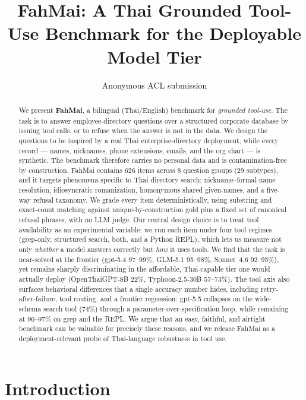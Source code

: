 \documentclass[11pt]{article}
\title{FahMai: A Thai Grounded Tool-Use Benchmark for the Deployable Model Tier}
\author{Anonymous ACL submission}
\begin{document}
\maketitle

\begin{abstract}
We present \textbf{FahMai}, a bilingual (Thai/English) benchmark for \emph{grounded tool-use}. The
task is to answer employee-directory questions over a structured corporate database by issuing tool
calls, or to refuse when the answer is not in the data. We design the questions to be inspired by a
real Thai enterprise-directory deployment, while every record --- names, nicknames, phone extensions,
emails, and the org chart --- is synthetic. The benchmark therefore carries no personal data and is
contamination-free by construction. FahMai contains 626 items across 8 question groups (29 subtypes),
and it targets phenomena specific to Thai directory search: nickname--formal-name resolution,
idiosyncratic romanization, homonymous shared given-names, and a five-way refusal taxonomy. We grade
every item deterministically, using substring and exact-count matching against unique-by-construction
gold plus a fixed set of canonical refusal phrases, with no LLM judge. Our central design choice is to
treat tool availability as an experimental variable: we run each item under four tool regimes
(grep-only, structured search, both, and a Python REPL), which lets us measure not only \emph{whether}
a model answers correctly but \emph{how} it uses tools. We find that the task is near-solved at the
frontier (gpt-5.4 97--99\%, GLM-5.1 95--98\%, Sonnet~4.6 92--95\%), yet remains sharply discriminating
in the affordable, Thai-capable tier one would actually deploy (OpenThaiGPT-8B 22\%, Typhoon-2.5-30B
57--73\%). The tool axis also surfaces behavioral differences that a single accuracy number hides,
including retry-after-failure, tool routing, and a frontier regression: gpt-5.5 collapses on the
wide-schema search tool (74\%) through a parameter-over-specification loop, while remaining at
96--97\% on grep and the REPL. We argue that an easy, faithful, and airtight benchmark can be valuable
for precisely these reasons, and we release FahMai as a deployment-relevant probe of Thai-language
robustness in tool use.
\end{abstract}

\section{Introduction}
\end{document}
